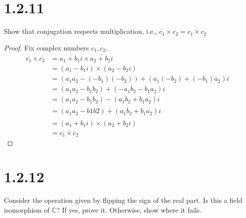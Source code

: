\documentclass[11pt]{article}
\begin{document}

\section{1.2.11}
Show that conjugation respects multiplication, i.e.,
$\overline{c_1} \times \overline{c_2} = \overline{c_1 \times c_2}$

\begin{proof}
	Fix complex numbers $c_1, c_2$. 
	\begin{align*}
		\overline{c_1} \times \overline{c_2} 
			&= \overline{a_1 + b_1i} \times \overline{a_2 + b_2i}  \\ 
			&= (a_1 - b_1i) \times (a_2 - b_2i) \\
			&= (a_1a_2 - (-b_1)(-b_2)) + (a_1(-b_2) + (-b_1)a_2)i \\
			&= (a_1a_2 - b_1b_2) + (-a_1b_2 - b_1a_2)i \\
			&= (a_1a_2 - b_1b_2) - (a_1b_2 + b_1a_2)i \\
			&= \overline{(a_1a_2 - b1b2) + (a_1b_2 + b_1a_2)i} \\
			&= \overline{(a_1 + b_1i) \times (a_2 + b_2i)} \\
		        &= \overline{c_1 \times c_2}
	\end{align*}
\end{proof}



\section{1.2.12}
Consider the operation given by flipping the sign of the real part. Is this a field isomorphism of $\mathbb{C}$? If yes, prove it. Otherwise, show where it fails.
\end{document}
